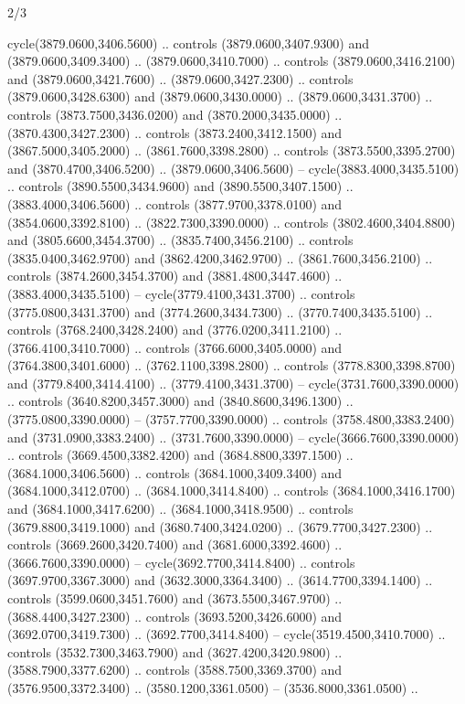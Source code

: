 \begin{flagdescription}{2/3}
\begin{scope}[shift={(0.5\flaglength,0.5)},scale=\flagwidth/130]
\begin{scope}[y=0.01mm, x=0.01mm,shift={(-3365,-2250)}]
  cycle(3879.0600,3406.5600) .. controls (3879.0600,3407.9300) and
  (3879.0600,3409.3400) .. (3879.0600,3410.7000) .. controls
  (3879.0600,3416.2100) and (3879.0600,3421.7600) .. (3879.0600,3427.2300) ..
  controls (3879.0600,3428.6300) and (3879.0600,3430.0000) ..
  (3879.0600,3431.3700) .. controls (3873.7500,3436.0200) and
  (3870.2000,3435.0000) .. (3870.4300,3427.2300) .. controls
  (3873.2400,3412.1500) and (3867.5000,3405.2000) .. (3861.7600,3398.2800) ..
  controls (3873.5500,3395.2700) and (3870.4700,3406.5200) ..
  (3879.0600,3406.5600) -- cycle(3883.4000,3435.5100) .. controls
  (3890.5500,3434.9600) and (3890.5500,3407.1500) .. (3883.4000,3406.5600) ..
  controls (3877.9700,3378.0100) and (3854.0600,3392.8100) ..
  (3822.7300,3390.0000) .. controls (3802.4600,3404.8800) and
  (3805.6600,3454.3700) .. (3835.7400,3456.2100) .. controls
  (3835.0400,3462.9700) and (3862.4200,3462.9700) .. (3861.7600,3456.2100) ..
  controls (3874.2600,3454.3700) and (3881.4800,3447.4600) ..
  (3883.4000,3435.5100) -- cycle(3779.4100,3431.3700) .. controls
  (3775.0800,3431.3700) and (3774.2600,3434.7300) .. (3770.7400,3435.5100) ..
  controls (3768.2400,3428.2400) and (3776.0200,3411.2100) ..
  (3766.4100,3410.7000) .. controls (3766.6000,3405.0000) and
  (3764.3800,3401.6000) .. (3762.1100,3398.2800) .. controls
  (3778.8300,3398.8700) and (3779.8400,3414.4100) .. (3779.4100,3431.3700) --
  cycle(3731.7600,3390.0000) .. controls (3640.8200,3457.3000) and
  (3840.8600,3496.1300) .. (3775.0800,3390.0000) -- (3757.7700,3390.0000) ..
  controls (3758.4800,3383.2400) and (3731.0900,3383.2400) ..
  (3731.7600,3390.0000) -- cycle(3666.7600,3390.0000) .. controls
  (3669.4500,3382.4200) and (3684.8800,3397.1500) .. (3684.1000,3406.5600) ..
  controls (3684.1000,3409.3400) and (3684.1000,3412.0700) ..
  (3684.1000,3414.8400) .. controls (3684.1000,3416.1700) and
  (3684.1000,3417.6200) .. (3684.1000,3418.9500) .. controls
  (3679.8800,3419.1000) and (3680.7400,3424.0200) .. (3679.7700,3427.2300) ..
  controls (3669.2600,3420.7400) and (3681.6000,3392.4600) ..
  (3666.7600,3390.0000) -- cycle(3692.7700,3414.8400) .. controls
  (3697.9700,3367.3000) and (3632.3000,3364.3400) .. (3614.7700,3394.1400) ..
  controls (3599.0600,3451.7600) and (3673.5500,3467.9700) ..
  (3688.4400,3427.2300) .. controls (3693.5200,3426.6000) and
  (3692.0700,3419.7300) .. (3692.7700,3414.8400) -- cycle(3519.4500,3410.7000)
  .. controls (3532.7300,3463.7900) and (3627.4200,3420.9800) ..
  (3588.7900,3377.6200) .. controls (3588.7500,3369.3700) and
  (3576.9500,3372.3400) .. (3580.1200,3361.0500) -- (3536.8000,3361.0500) ..

\end{scope}
\end{scope}
\end{flagdescription}
